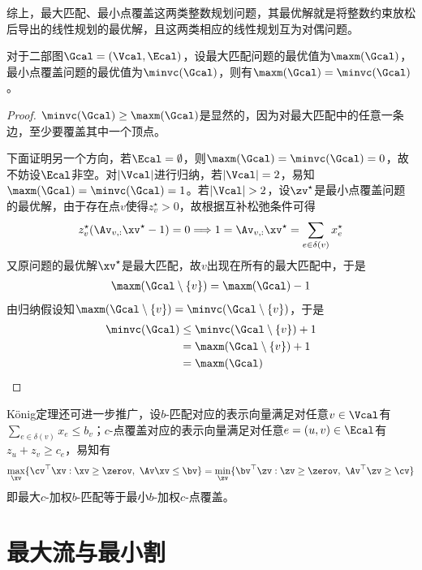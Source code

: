 \documentclass{ctexart}
\begin{document}
综上，最大匹配、最小点覆盖这两类整数规划问题，其最优解就是将整数约束放松后导出的线性规划的最优解，且这两类相应的线性规划互为对偶问题。

\begin{theorem} [König]
    对于二部图$\Gcal = (\Vcal, \Ecal)$，设最大匹配问题的最优值为$\maxm(\Gcal)$，最小点覆盖问题的最优值为$\minvc(\Gcal)$，则有$\maxm(\Gcal) = \minvc(\Gcal)$。
\end{theorem}

\begin{proof}
    $\minvc(\Gcal) \ge \maxm(\Gcal)$是显然的，因为对最大匹配中的任意一条边，至少要覆盖其中一个顶点。

    下面证明另一个方向，若$\Ecal = \emptyset$，则$\maxm(\Gcal) = \minvc(\Gcal) = 0$，故不妨设$\Ecal$非空。对$|\Vcal|$进行归纳，若$|\Vcal| = 2$，易知$\maxm(\Gcal) = \minvc(\Gcal) = 1$。若$|\Vcal| > 2$，设$\zv^\star$是最小点覆盖问题的最优解，由于存在点$v$使得$z_v^\star > 0$，故根据互补松弛条件可得
    \begin{align*}
        z_v^\star (\Av_{v,:} \xv^\star - 1) = 0 \Longrightarrow 1 = \Av_{v,:} \xv^\star = \sum_{e \in \delta(v)} x_e^\star
    \end{align*}
    又原问题的最优解$\xv^\star$是最大匹配，故$v$出现在所有的最大匹配中，于是
    \begin{align*}
        \maxm(\Gcal \setminus \{v\}) = \maxm(\Gcal) - 1
    \end{align*}
    由归纳假设知$\maxm(\Gcal \setminus \{v\}) = \minvc(\Gcal \setminus \{v\})$，于是
    \begin{align*}
        \minvc(\Gcal) & \le \minvc(\Gcal \setminus \{v\}) + 1 \\
                      & = \maxm(\Gcal \setminus \{v\}) + 1    \\
                      & = \maxm(\Gcal)
    \end{align*}
\end{proof}

König定理还可进一步推广，设$b$-匹配对应的表示向量满足对任意$v \in \Vcal$有$\sum_{e \in \delta(v)} x_e \le b_v$；$c$-点覆盖对应的表示向量满足对任意$e = (u,v) \in \Ecal$有$z_u + z_v \ge c_e$，易知有
\begin{align*}
    \max_{\xv} \{ \cv^\top \xv : \xv \ge \zerov, ~ \Av \xv \le \bv \} = \min_{\zv} \{ \bv^\top \zv : \zv \ge \zerov, ~ \Av^\top \zv \ge \cv \}
\end{align*}
即最大$c$-加权$b$-匹配等于最小$b$-加权$c$-点覆盖。

\section{最大流与最小割}
\end{document}
